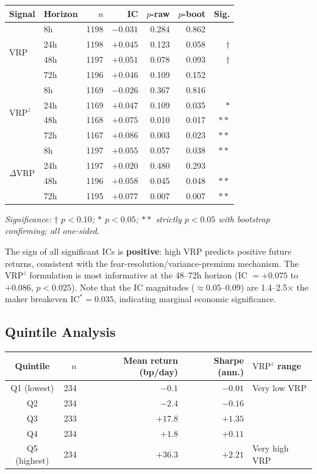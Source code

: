 \documentclass[12pt, a4paper]{article}
\theoremstyle{plain}
\theoremstyle{definition}
\newcommand{\IC}{\mathrm{IC}}
\newcommand{\VRP}{\mathrm{VRP}}
\begin{document}
\begin{center}
\begin{tabular}{llrrrrr}
\toprule
Signal & Horizon & $n$ & IC & $p$-raw & $p$-boot & Sig. \\
\midrule
\multirow{4}{*}{$\VRP$}
  & 8h  & 1198 & $-0.031$ & 0.284 & 0.862 & \\
  & 24h & 1198 & $+0.045$ & 0.123 & 0.058 & $\dagger$ \\
  & 48h & 1197 & $+0.051$ & 0.078 & 0.093 & $\dagger$ \\
  & 72h & 1196 & $+0.046$ & 0.109 & 0.152 & \\
\midrule
\multirow{4}{*}{$\VRP^z$}
  & 8h  & 1169 & $-0.026$ & 0.367 & 0.816 & \\
  & 24h & 1169 & $+0.047$ & 0.109 & 0.035 & $*$ \\
  & 48h & 1168 & $+0.075$ & 0.010 & 0.017 & $**$ \\
  & 72h & 1167 & $+0.086$ & 0.003 & 0.023 & $**$ \\
\midrule
\multirow{4}{*}{$\Delta\VRP$}
  & 8h  & 1197 & $+0.055$ & 0.057 & 0.038 & $**$ \\
  & 24h & 1197 & $+0.020$ & 0.480 & 0.293 & \\
  & 48h & 1196 & $+0.058$ & 0.045 & 0.048 & $**$ \\
  & 72h & 1195 & $+0.077$ & 0.007 & 0.007 & $**$ \\
\bottomrule
\end{tabular}
\end{center}

\textit{Significance: $\dagger$ $p<0.10$; $*$ $p<0.05$; $**$ strictly
$p<0.05$ with bootstrap confirming; all one-sided.}

\medskip
The sign of all significant ICs is \textbf{positive}: high VRP predicts
positive future returns, consistent with the fear-resolution/variance-premium
mechanism.  The $\VRP^z$ formulation is most informative at the 48--72h
horizon (IC $= +0.075$ to $+0.086$, $p < 0.025$).  Note that the
IC magnitudes ($\approx 0.05$--$0.09$) are 1.4--2.5$\times$ the maker
breakeven $\IC^* = 0.035$, indicating marginal economic significance.

\subsection{Quintile Analysis}

\begin{center}
\begin{tabular}{crrrl}
\toprule
Quintile & $n$ & Mean return (bp/day) & Sharpe (ann.) & $\VRP^z$ range \\
\midrule
Q1 (lowest) & 234 & $-0.1$ & $-0.01$ & Very low VRP \\
Q2          & 234 & $-2.4$ & $-0.16$ & \\
Q3          & 233 & $+17.8$ & $+1.35$ & \\
Q4          & 234 & $+1.8$  & $+0.11$ & \\
Q5 (highest)& 234 & $+36.3$ & $+2.21$ & Very high VRP \\
\bottomrule
\end{tabular}
\end{center}
\end{document}
